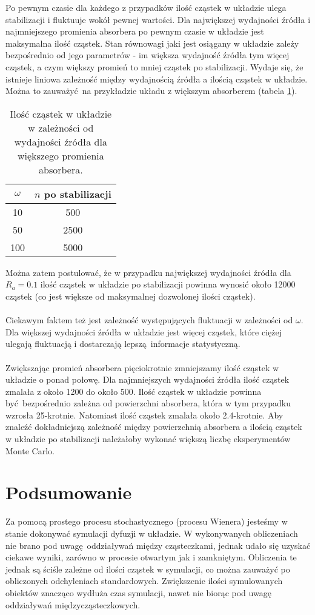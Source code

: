 \documentclass[a4paper, 12pt]{article}
\begin{document}
\noaka Po pewnym czasie dla każdego z przypadków ilość cząstek w układzie ulega stabilizacji i fluktuuje wokół pewnej wartości.
Dla największej wydajności źródła i najmniejszego promienia absorbera po pewnym czasie w układzie jest maksymalna ilość cząstek. 
Stan równowagi jaki jest osiągany w układzie zależy bezpośrednio od jego parametrów - im większa wydajność źródła tym więcej cząstek, a czym większy promień to mniej cząstek po stabilizacji.
Wydaje się, że istnieje liniowa zależność między wydajnością źródła a ilością cząstek w układzie. 
Można to zauważyć na przykładzie układu z większym absorberem (tabela \ref{tab1}).
\begin{table}[h]
	\caption{Ilość cząstek w układzie w zależności od wydajności źródła dla większego promienia absorbera.}
	\label{tab1}
	\centering
	\begin{tabular}{|c|c|}
		\hline
		$\omega$ & $n$ po stabilizacji \\ \hline
		10 & 500 \\ \hline
		50 & 2500 \\ \hline
		100 & 5000 \\ \hline
	\end{tabular}
\end{table}
Można zatem postulować, że w przypadku największej wydajności źródła dla $R_a = 0.1$ ilość cząstek w układzie po stabilizacji powinna wynosić około 12000 cząstek (co jest większe od maksymalnej dozwolonej ilości cząstek).
\\
\\
Ciekawym faktem też jest zależność występujących fluktuacji w zależności od $\omega$.
Dla większej wydajności źródła w układzie jest więcej cząstek, które ciężej ulegają fluktuacją i dostarczają lepszą informacje statystyczną. 
\\
\\
Zwiększając promień absorbera pięciokrotnie zmniejszamy ilość cząstek w układzie o ponad połowę.
Dla najmniejszych wydajności źródła ilość cząstek zmalała z około 1200 do około 500. 
Ilość cząstek w układzie powinna być bezpośrednio zależna od powierzchni absorbera, która w tym przypadku wzrosła 25-krotnie. 
Natomiast ilość cząstek zmalała około 2.4-krotnie. 
Aby znaleźć dokładniejszą zależność między powierzchnią absorbera a ilością cząstek w układzie po stabilizacji należałoby wykonać większą liczbę eksperymentów Monte Carlo.

\section*{Podsumowanie}

Za pomocą prostego procesu stochastycznego (procesu Wienera) jesteśmy w stanie dokonywać symulacji dyfuzji w układzie.
W wykonywanych obliczeniach nie brano pod uwagę oddziaływań między cząsteczkami, jednak udało się uzyskać ciekawe wyniki, zarówno w procesie otwartym jak i zamkniętym.
Obliczenia te jednak są ściśle zależne od ilości cząstek w symulacji, co można zauważyć po obliczonych odchyleniach standardowych.
Zwiększenie ilości symulowanych obiektów znacząco wydłuża czas symulacji, nawet nie biorąc pod uwagę oddziaływań międzycząsteczkowych.

	
\end{document}
